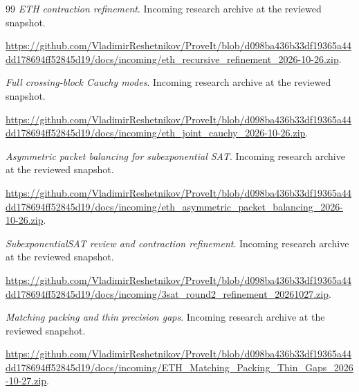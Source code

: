 \begin{thebibliography}{99}
 \emph{ETH contraction refinement}. Incoming research archive at the reviewed snapshot.

\url{https://github.com/VladimirReshetnikov/ProveIt/blob/d098ba436b33df19365a44dd178694ff52845d19/docs/incoming/eth_recursive_refinement_2026-10-26.zip}.

 \emph{Full crossing-block Cauchy modes}. Incoming research archive at the reviewed snapshot.

\url{https://github.com/VladimirReshetnikov/ProveIt/blob/d098ba436b33df19365a44dd178694ff52845d19/docs/incoming/eth_joint_cauchy_2026-10-26.zip}.

 \emph{Asymmetric packet balancing for subexponential SAT}. Incoming research archive at the reviewed snapshot.

\url{https://github.com/VladimirReshetnikov/ProveIt/blob/d098ba436b33df19365a44dd178694ff52845d19/docs/incoming/eth_asymmetric_packet_balancing_2026-10-26.zip}.

 \emph{SubexponentialSAT review and contraction refinement}. Incoming research archive at the reviewed snapshot.

\url{https://github.com/VladimirReshetnikov/ProveIt/blob/d098ba436b33df19365a44dd178694ff52845d19/docs/incoming/3sat_round2_refinement_20261027.zip}.

 \emph{Matching packing and thin precision gaps}. Incoming research archive at the reviewed snapshot.

\url{https://github.com/VladimirReshetnikov/ProveIt/blob/d098ba436b33df19365a44dd178694ff52845d19/docs/incoming/ETH_Matching_Packing_Thin_Gaps_2026-10-27.zip}.

\end{thebibliography}
